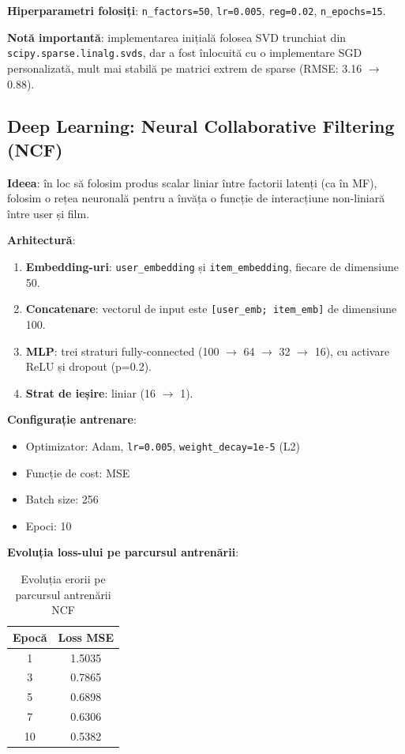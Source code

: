 \documentclass[12pt,a4paper]{article}
\begin{document}
\textbf{Hiperparametri folosiți}: \texttt{n\_factors=50}, \texttt{lr=0.005}, \texttt{reg=0.02}, \texttt{n\_epochs=15}.

\textbf{Notă importantă}: implementarea inițială folosea SVD trunchiat din \texttt{scipy.sparse.linalg.svds}, dar a fost înlocuită cu o implementare SGD personalizată, mult mai stabilă pe matrici extrem de sparse (RMSE: 3.16 $\rightarrow$ 0.88).

\subsection{Deep Learning: Neural Collaborative Filtering (NCF)}

\textbf{Ideea}: în loc să folosim produs scalar liniar între factorii latenți (ca în MF), folosim o rețea neuronală pentru a învăța o funcție de interacțiune non-liniară între user și film.

\textbf{Arhitectură}:
\begin{enumerate}[noitemsep]
    \item \textbf{Embedding-uri}: \texttt{user\_embedding} și \texttt{item\_embedding}, fiecare de dimensiune 50.
    \item \textbf{Concatenare}: vectorul de input este \texttt{[user\_emb; item\_emb]} de dimensiune 100.
    \item \textbf{MLP}: trei straturi fully-connected (100 $\rightarrow$ 64 $\rightarrow$ 32 $\rightarrow$ 16), cu activare ReLU și dropout (p=0.2).
    \item \textbf{Strat de ieșire}: liniar (16 $\rightarrow$ 1).
\end{enumerate}

\textbf{Configurație antrenare}:
\begin{itemize}[noitemsep]
    \item Optimizator: Adam, \texttt{lr=0.005}, \texttt{weight\_decay=1e-5} (L2)
    \item Funcție de cost: MSE
    \item Batch size: 256
    \item Epoci: 10
\end{itemize}

\textbf{Evoluția loss-ului pe parcursul antrenării}:
\begin{table}[H]
\centering
\begin{tabular}{cc}
\toprule
\textbf{Epocă} & \textbf{Loss MSE} \\
\midrule
1 & 1.5035 \\
3 & 0.7865 \\
5 & 0.6898 \\
7 & 0.6306 \\
10 & 0.5382 \\
\bottomrule
\end{tabular}
\caption{Evoluția erorii pe parcursul antrenării NCF}
\end{table}
\end{document}
